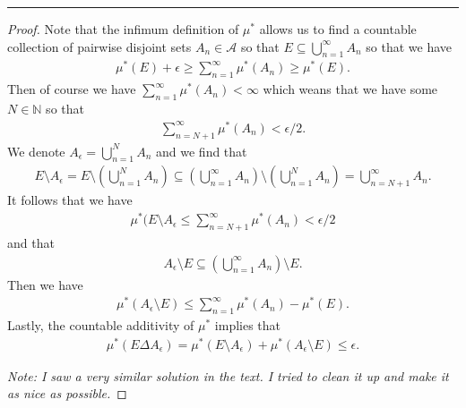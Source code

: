 \documentclass[leqno]{article}
\theoremstyle{nonumberplain}
\newtheorem{proof}{Proof}
\newcommand{\N}{\mathbb{N}}
\begin{document}
\noindent\rule[0.5ex]{\linewidth}{1pt}


\begin{proof}
Note that the infimum definition of $\mu^*$ allows us to find a countable collection of pairwise disjoint sets $A_n \in \mathcal{A}$ so that $E\subseteq \bigcup_{n=1}^\infty A_n$ so that we have
\begin{align*}
\mu^*(E)+\epsilon\geq \sum_{n=1}^\infty \mu^*(A_n)\geq \mu^*(E).
\end{align*}
Then of course we have $\sum_{n=1}^\infty \mu^*(A_n) < \infty$ which weans that we have some $N\in \N$ so that 
\begin{align*}
\sum_{n=N+1}^\infty \mu^*(A_n) <\epsilon/2.
\end{align*}
We denote $A_\epsilon = \bigcup_{n=1}^N A_n$ and we find that
\begin{align*}
E\setminus A_\epsilon = E\setminus \left( \bigcup_{n=1}^N A_n \right) \subseteq \left( \bigcup_{n=1}^\infty A_n\right) \setminus \left( \bigcup_{n=1}^N A_n \right) = \bigcup_{n=N+1}^\infty A_n.
\end{align*}
It follows that we have
\begin{align*}
\mu^*(E\setminus A_\epsilon \leq \sum_{n=N+1}^\infty \mu^*(A_n)<\epsilon/2
\end{align*}
and that
\begin{align*}
A_\epsilon \setminus E \subseteq \left( \bigcup_{n=1}^\infty A_n \right) \setminus E.
\end{align*}
Then we have
\begin{align*}
\mu^*(A_\epsilon \setminus E ) \leq \sum_{n=1}^\infty \mu^*(A_n)-\mu^*(E).
\end{align*}
Lastly, the countable additivity of $\mu^*$ implies that
\begin{align*}
\mu^*(E\Delta A_\epsilon) = \mu^*(E\setminus A_\epsilon)+\mu^*(A_\epsilon \setminus E ) \leq \epsilon.
\end{align*}

\noindent \emph{Note: I saw a very similar solution in the text. I tried to clean it up and make it as nice as possible.}
\end{proof}


\pagebreak

\end{document}

